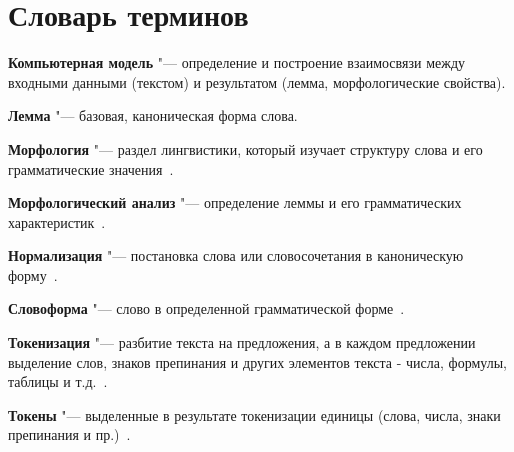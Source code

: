 \chapter*{Словарь терминов}             %

\textbf{Компьютерная модель} "--- определение и построение взаимосвязи между входными данными (текстом) и результатом (лемма, морфологические свойства).

\textbf{Лемма} "--- базовая, каноническая форма слова.

\textbf{Морфология} "--- раздел лингвистики, который изучает структуру слова и его грамматические значения~\cite{MitreninaNikolaevLando2016}.

\textbf{Морфологический анализ} "--- определение леммы и его грамматических характеристик~\cite{MitreninaNikolaevLando2016}.

\textbf{Нормализация} "--- постановка слова или словосочетания в каноническую форму~\cite{MitreninaNikolaevLando2016}.

\textbf{Словоформа} "--- слово в определенной грамматической форме~\cite{MitreninaNikolaevLando2016}.

\textbf{Токенизация} "--- разбитие текста на предложения, а в каждом предложении выделение слов, знаков препинания и других элементов текста - числа, формулы, таблицы и т.д.~\cite{MitreninaNikolaevLando2016}.

\textbf{Токены} "--- выделенные в результате токенизации единицы (слова, числа, знаки препинания и пр.)~\cite{MitreninaNikolaevLando2016}.